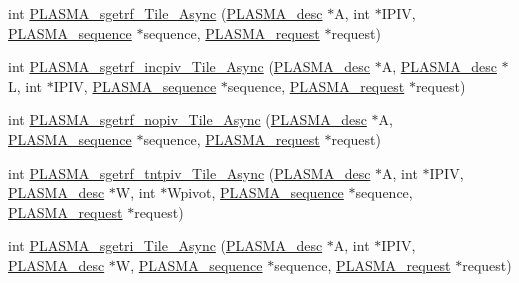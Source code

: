 \begin{DoxyCompactItemize}
\item 
int \hyperlink{group__float__Tile__Async_gae899a1ecfe2fcd225ac993fbd1e88eba_gae899a1ecfe2fcd225ac993fbd1e88eba}{P\+L\+A\+S\+M\+A\+\_\+sgetrf\+\_\+\+Tile\+\_\+\+Async} (\hyperlink{structplasma__desc__t}{P\+L\+A\+S\+M\+A\+\_\+desc} $\ast$A, int $\ast$I\+P\+I\+V, \hyperlink{structplasma__sequence__t}{P\+L\+A\+S\+M\+A\+\_\+sequence} $\ast$sequence, \hyperlink{structplasma__request__t}{P\+L\+A\+S\+M\+A\+\_\+request} $\ast$request)
\item 
int \hyperlink{group__float__Tile__Async_ga5efaa488eacff97a946efcbfe2948b28_ga5efaa488eacff97a946efcbfe2948b28}{P\+L\+A\+S\+M\+A\+\_\+sgetrf\+\_\+incpiv\+\_\+\+Tile\+\_\+\+Async} (\hyperlink{structplasma__desc__t}{P\+L\+A\+S\+M\+A\+\_\+desc} $\ast$A, \hyperlink{structplasma__desc__t}{P\+L\+A\+S\+M\+A\+\_\+desc} $\ast$L, int $\ast$I\+P\+I\+V, \hyperlink{structplasma__sequence__t}{P\+L\+A\+S\+M\+A\+\_\+sequence} $\ast$sequence, \hyperlink{structplasma__request__t}{P\+L\+A\+S\+M\+A\+\_\+request} $\ast$request)
\item 
int \hyperlink{group__float__Tile__Async_ga2889753e80c6a0d719b19c77a04e4689_ga2889753e80c6a0d719b19c77a04e4689}{P\+L\+A\+S\+M\+A\+\_\+sgetrf\+\_\+nopiv\+\_\+\+Tile\+\_\+\+Async} (\hyperlink{structplasma__desc__t}{P\+L\+A\+S\+M\+A\+\_\+desc} $\ast$A, \hyperlink{structplasma__sequence__t}{P\+L\+A\+S\+M\+A\+\_\+sequence} $\ast$sequence, \hyperlink{structplasma__request__t}{P\+L\+A\+S\+M\+A\+\_\+request} $\ast$request)
\item 
int \hyperlink{group__float__Tile__Async_ga22dc7cb89a18ee635418e53fb71b4821_ga22dc7cb89a18ee635418e53fb71b4821}{P\+L\+A\+S\+M\+A\+\_\+sgetrf\+\_\+tntpiv\+\_\+\+Tile\+\_\+\+Async} (\hyperlink{structplasma__desc__t}{P\+L\+A\+S\+M\+A\+\_\+desc} $\ast$A, int $\ast$I\+P\+I\+V, \hyperlink{structplasma__desc__t}{P\+L\+A\+S\+M\+A\+\_\+desc} $\ast$W, int $\ast$Wpivot, \hyperlink{structplasma__sequence__t}{P\+L\+A\+S\+M\+A\+\_\+sequence} $\ast$sequence, \hyperlink{structplasma__request__t}{P\+L\+A\+S\+M\+A\+\_\+request} $\ast$request)
\item 
int \hyperlink{group__float__Tile__Async_gaaa53ab212ba282b26473c329e9137f8c_gaaa53ab212ba282b26473c329e9137f8c}{P\+L\+A\+S\+M\+A\+\_\+sgetri\+\_\+\+Tile\+\_\+\+Async} (\hyperlink{structplasma__desc__t}{P\+L\+A\+S\+M\+A\+\_\+desc} $\ast$A, int $\ast$I\+P\+I\+V, \hyperlink{structplasma__desc__t}{P\+L\+A\+S\+M\+A\+\_\+desc} $\ast$W, \hyperlink{structplasma__sequence__t}{P\+L\+A\+S\+M\+A\+\_\+sequence} $\ast$sequence, \hyperlink{structplasma__request__t}{P\+L\+A\+S\+M\+A\+\_\+request} $\ast$request)

\end{DoxyCompactItemize}
